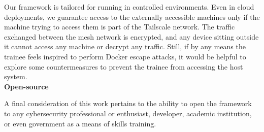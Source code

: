 Our framework is tailored for running in controlled environments. Even in cloud deployments, we guarantee access to the externally accessible machines only if the machine trying to access them is part of the Tailscale network. The traffic exchanged between the mesh network is encrypted, and any device sitting outside it cannot access any machine or decrypt any traffic. Still, if by any means the trainee feels inspired to perform Docker escape attacks, it would be helpful to explore some countermeasures to prevent the trainee from accessing the host system.\\

\textbf{Open-source}

A final consideration of this work pertains to the ability to open the framework to any cybersecurity professional or enthusiast, developer, academic institution, or even government as a means of skills training.
